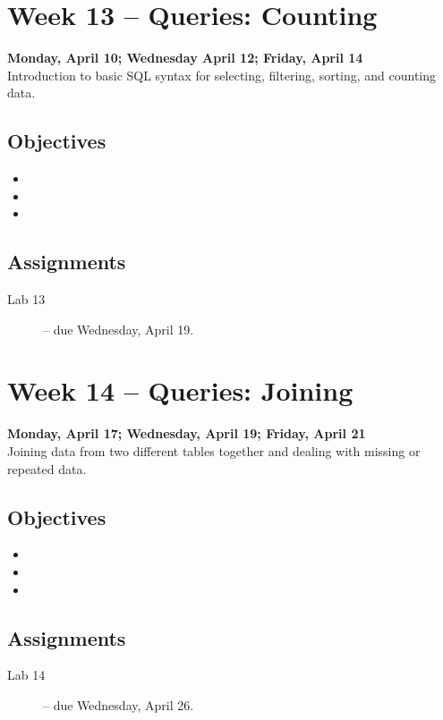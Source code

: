 \documentclass[10pt]{memoir}
\begin{document}
\section{Week 13 -- Queries: Counting}
\textcolor{CUGold}{\textbf{Monday, April 10; Wednesday April 12; Friday, April 14}}\\
Introduction to basic SQL syntax for selecting, filtering, sorting, and counting data.

    \subsection{Objectives}
    \begin{itemize}
        \item 
        \item 
        \item 
    \end{itemize}

    \subsection{Assignments}
    \begin{description}%
        \item[Lab 13 ] -- due Wednesday, April 19.
    \end{description}
    
\section{Week 14 -- Queries: Joining}
\textcolor{CUGold}{\textbf{Monday, April 17; Wednesday, April 19; Friday, April 21}}\\
Joining data from two different tables together and dealing with missing or repeated data. 

    \subsection{Objectives}
    \begin{itemize}
        \item 
        \item 
        \item 
    \end{itemize}

    \subsection{Assignments}
    \begin{description}%
        \item[Lab 14 ] -- due Wednesday, April 26.
    \end{description}
    
\end{document}

